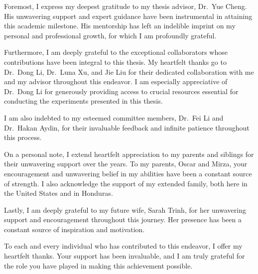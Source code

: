 \documentclass[11pt]{report}
\begin{document}

\acknowledgementspage

{
\setlength{\parskip}{1em}
\noindent Foremost, I express my deepest gratitude to my thesis advisor, Dr.~Yue Cheng. His unwavering support and expert guidance have been instrumental in attaining this academic milestone. His mentorship has left an indelible imprint on my personal and professional growth, for which I am profoundly grateful.

\noindent Furthermore, I am deeply grateful to the exceptional collaborators whose contributions have been integral to this thesis. My heartfelt thanks go to Dr.~Dong Li, Dr.~Luna Xu, and Jie Liu for their dedicated collaboration with me and my advisor throughout this endeavor. I am especially appreciative of Dr.~Dong Li for generously providing access to crucial resources essential for conducting the experiments presented in this thesis.

\noindent I am also indebted to my esteemed committee members, Dr.~Fei Li and Dr.~Hakan Aydin, for their invaluable feedback and infinite patience throughout this process.

\noindent On a personal note, I extend heartfelt appreciation to my parents and siblings for their unwavering support over the years. To my parents, Oscar and Mirza, your encouragement and unwavering belief in my abilities have been a constant source of strength. I also acknowledge the support of my extended family, both here in the United States and in Honduras.

\noindent Lastly, I am deeply grateful to my future wife, Sarah Trinh, for her unwavering support and encouragement throughout this journey. Her presence has been a constant source of inspiration and motivation.

\noindent To each and every individual who has contributed to this endeavor, I offer my heartfelt thanks. Your support has been invaluable, and I am truly grateful for the role you have played in making this achievement possible.
}
\end{document}
